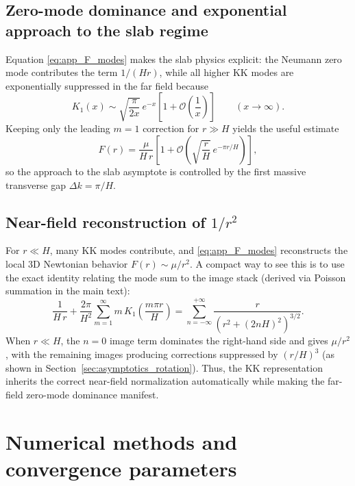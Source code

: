 \documentclass[11pt]{article}
\begin{document}
\subsection{Zero-mode dominance and exponential approach to the slab regime}

Equation \eqref{eq:app_F_modes} makes the slab physics explicit:
the Neumann zero mode contributes the term $1/(H r)$, while all higher KK modes are exponentially
suppressed in the far field because
\begin{equation}
  K_1(x) \sim \sqrt{\frac{\pi}{2x}}\,e^{-x}\left[1+\mathcal{O}\!\left(\frac{1}{x}\right)\right]
  \qquad (x\to\infty).
\end{equation}
Keeping only the leading $m=1$ correction for $r\gg H$ yields the useful estimate
\begin{equation}
  F(r)
  =
  \frac{\mu}{H\,r}\left[
    1
    + \mathcal{O}\!\left(\sqrt{\frac{r}{H}}\,e^{-\pi r/H}\right)
  \right],
  \label{eq:app_zero_mode_correction}
\end{equation}
so the approach to the slab asymptote is controlled by the first massive transverse gap
$\Delta k = \pi/H$.

\subsection{Near-field reconstruction of $1/r^2$}

For $r\ll H$, many KK modes contribute, and \eqref{eq:app_F_modes} reconstructs the local 3D Newtonian
behavior $F(r)\sim \mu/r^2$.
A compact way to see this is to use the exact identity relating the mode sum to the image stack
(derived via Poisson summation in the main text):
\begin{equation}
  \frac{1}{H\,r}
  +\frac{2\pi}{H^2}\sum_{m=1}^{\infty}
  m\,K_1\!\left(\frac{m\pi r}{H}\right)
  =
  \sum_{n=-\infty}^{+\infty}
  \frac{r}{\left(r^2+(2nH)^2\right)^{3/2}}.
  \label{eq:app_identity_repeat}
\end{equation}
When $r\ll H$, the $n=0$ image term dominates the right-hand side and gives $\mu/r^2$, with the
remaining images producing corrections suppressed by $(r/H)^3$ (as shown in
Section~\ref{sec:asymptotics_rotation}).  Thus, the KK representation inherits the correct near-field
normalization automatically while making the far-field zero-mode dominance manifest.

\section{Numerical methods and convergence parameters}
\label{app:numerics}
\end{document}
